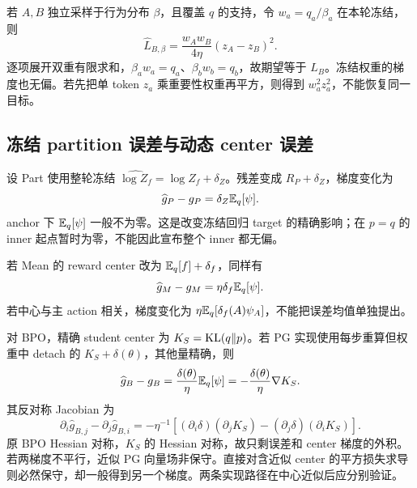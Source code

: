 若 $A,B$ 独立采样于行为分布 $\beta$，且覆盖 $q$ 的支持，令 $w_a=q_a/\beta_a$ 在本轮冻结，则
\begin{equation}
\widehat L_{B,\beta}=\frac{w_Aw_B}{4\eta}(z_A-z_B)^2.
\end{equation}
逐项展开双重有限求和，$\beta_aw_a=q_a$、$\beta_bw_b=q_b$，故期望等于 $L_B$。冻结权重的梯度也无偏。若先把单 token $z_a$ 乘重要性权重再平方，则得到 $w_a^2z_a^2$，不能恢复同一目标。

\subsection{冻结 partition 误差与动态 center 误差}
\label{est:center-error}
设 Part 使用整轮冻结 $\widehat{\log Z_f}=\log Z_f+\delta_Z$。残差变成 $R_P+\delta_Z$，梯度变化为
\begin{equation}
\widehat g_P-g_P=\delta_Z \mathbb E_q[\psi].
\end{equation}
anchor 下 $\mathbb E_q[\psi]$ 一般不为零。这是改变冻结回归 target 的精确影响；在 $p=q$ 的 inner 起点暂时为零，不能因此宣布整个 inner 都无偏。

若 Mean 的 reward center 改为 $\mathbb E_q[f]+\delta_f$，同样有
\begin{equation}
\widehat g_M-g_M=\eta\delta_f \mathbb E_q[\psi].
\end{equation}
若中心与主 action 相关，梯度变化为 $\eta\mathbb E_q[\delta_f(A)\psi_A]$，不能把误差均值单独提出。

对 BPO，精确 student center 为 $K_S=\operatorname{KL}(q\Vert p)$。若 PG 实现使用每步重算但权重中 detach 的 $K_S+\delta(\theta)$，其他量精确，则
\begin{equation}
\widehat g_B-g_B=\frac{\delta(\theta)}\eta \mathbb E_q[\psi]
=-\frac{\delta(\theta)}\eta\nabla K_S.
\end{equation}
其反对称 Jacobian 为
\begin{equation}
\partial_i\widehat g_{B,j}-\partial_j\widehat g_{B,i}
=-\eta^{-1}[(\partial_i\delta)(\partial_jK_S)-(\partial_j\delta)(\partial_iK_S)].
\end{equation}
原 BPO Hessian 对称，$K_S$ 的 Hessian 对称，故只剩误差和 center 梯度的外积。若两梯度不平行，近似 PG 向量场非保守。直接对含近似 center 的平方损失求导则必然保守，却一般得到另一个梯度。两条实现路径在中心近似后应分别验证。
